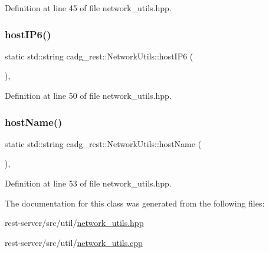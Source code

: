 Definition at line 45 of file network\+\_\+utils.\+hpp.

\mbox{\label{classcadg__rest_1_1_network_utils_ab398011818d40b7f7fb040e755decc86}} 
\subsubsection{\texorpdfstring{hostIP6()}{hostIP6()}}
{\footnotesize\ttfamily static std\+::string cadg\+\_\+rest\+::\+Network\+Utils\+::host\+I\+P6 (\begin{DoxyParamCaption}{ }\end{DoxyParamCaption})\hspace{0.3cm}{\ttfamily [inline]}, {\ttfamily [static]}}



Definition at line 50 of file network\+\_\+utils.\+hpp.

\mbox{\label{classcadg__rest_1_1_network_utils_a94f6fe4c9c074cf4e52d8ad80e46ce5b}} 
\subsubsection{\texorpdfstring{hostName()}{hostName()}}
{\footnotesize\ttfamily static std\+::string cadg\+\_\+rest\+::\+Network\+Utils\+::host\+Name (\begin{DoxyParamCaption}{ }\end{DoxyParamCaption})\hspace{0.3cm}{\ttfamily [inline]}, {\ttfamily [static]}}



Definition at line 53 of file network\+\_\+utils.\+hpp.



The documentation for this class was generated from the following files\+:\begin{DoxyCompactItemize}
\item 
rest-\/server/src/util/\mbox{\hyperlink{network__utils_8hpp}{network\+\_\+utils.\+hpp}}\item 
rest-\/server/src/util/\mbox{\hyperlink{network__utils_8cpp}{network\+\_\+utils.\+cpp}}\end{DoxyCompactItemize}
